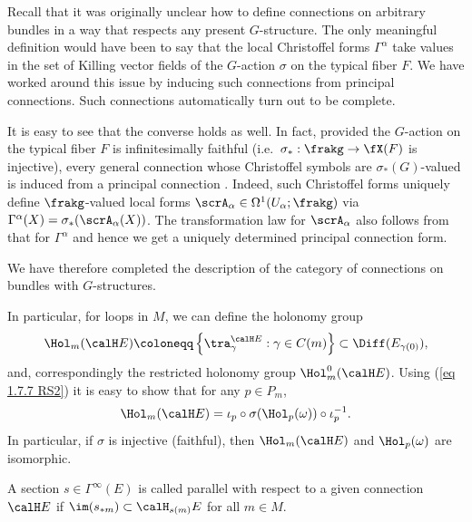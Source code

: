 \begin{rem}
    Recall that it was originally unclear how to define connections on arbitrary bundles in a way that respects any present $G$-structure. The only meaningful definition would have been to say that the local Christoffel forms $\Gamma^\alpha$ take values in the set of Killing vector fields of the $G$-action $\sigma$ on the typical fiber $F$. We have worked around this issue by inducing such connections from principal connections. Such connections automatically turn out to be complete. 
    
    It is easy to see that the converse holds as well. In fact, provided the $G$-action on the typical fiber $F$ is infinitesimally faithful (i.e.\ $\sigma_\ast:\frakg\to \fX(F)$ is injective), every general connection whose Christoffel symbols are $\sigma_\ast(G)$-valued is induced from a principal connection \cite{Kolar}. Indeed, such Christoffel forms uniquely define $\frakg$-valued local forms $\scrA_\alpha\in\Omega^1(U_\alpha;\frakg)$ via $\Gamma^\alpha(X)=\sigma_\ast(\scrA_\alpha(X))$. The transformation law for $\scrA_\alpha$ also follows from that for $\Gamma^\alpha$ and hence we get a uniquely determined principal connection form.
    

    We have therefore completed the description of the category of connections on bundles with $G$-structures.
\end{rem}

In  particular, for loops in $M$, we can define the holonomy group
\[\Hol_m(\calH E)\coloneqq \left\{\tra_\gamma^{\calH E}:\gamma\in C(m)\right\}\subset \Diff(E_{\gamma(0)}),\]
and, correspondingly the restricted holonomy group $\Hol_m^0(\calH E)$. Using (\ref{eq 1.7.7 RS2}) it is easy to show that for any $p\in P_m$,
\[\Hol_m(\calH E)=\iota_p\circ \sigma(\Hol_p(\omega))\circ \iota_p^{-1}.\]
In particular, if $\sigma$ is injective (faithful), then $\Hol_m(\calH E)$ and $\Hol_p(\omega)$ are isomorphic.

\begin{defn}\label{def parallel section}
    A section $s\in\Gamma^\infty(E)$ is called parallel with respect to a given connection $\calH E$ if $\im(s_{\ast m})\subset \calH_{s(m)}E$ for all $m\in M$.
\end{defn}

